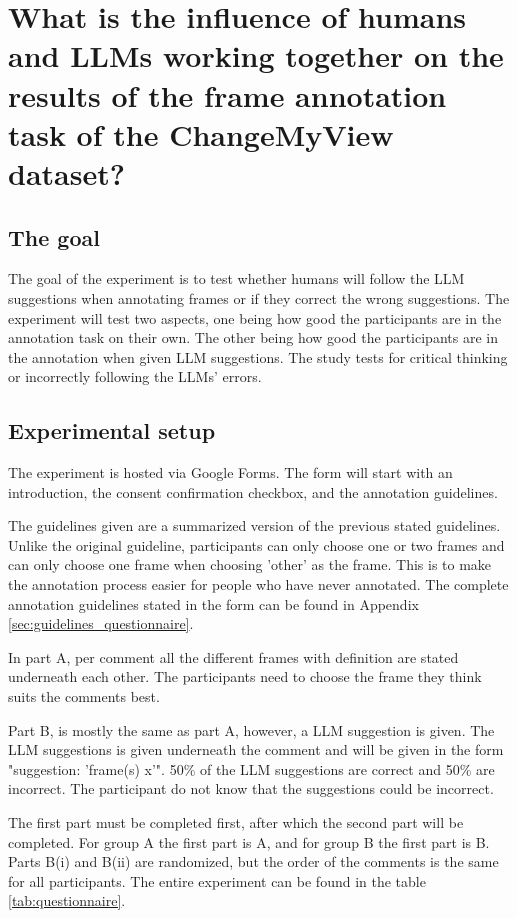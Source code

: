 \documentclass[
10pt, %
a4paper, %
oneside, %
headinclude,footinclude, %
] {book}%
\begin{document}
\section{What is the influence of humans and LLMs working together on the results of the frame annotation task of the ChangeMyView dataset?}

\subsection{The goal}
The goal of the experiment is to test whether humans will follow the LLM suggestions when annotating frames or if they correct the wrong suggestions. The experiment will test two aspects, one being how good the participants are in the annotation task on their own. The other being how good the participants are in the annotation when given LLM suggestions. The study tests for critical thinking or incorrectly following the LLMs' errors. 

\subsection{Experimental setup}
The experiment is hosted via Google Forms. The form will start with an introduction,  the consent confirmation checkbox, and the annotation guidelines. 

The guidelines given are a summarized version of the previous stated guidelines. Unlike the original guideline, participants can only choose one or two frames and can only choose one frame when choosing 'other' as the frame. This is to make the annotation process easier for people who have never annotated. The complete annotation guidelines stated in the form can be found in Appendix \ref{sec:guidelines_questionnaire}.

In part A, per comment all the different frames with definition are stated underneath each other. The participants need to choose the frame they think suits the comments best.

Part B, is mostly the same as part A, however, a LLM suggestion is given. The LLM suggestions is given underneath the comment and will be given in the form "suggestion: 'frame(s) x'". 50\% of the LLM suggestions are correct and 50\% are incorrect. The participant do not know that the suggestions could be incorrect.

The first part must be completed first, after which the second part will be completed. For group A the first part is A, and for group B the first part is B. Parts B(i) and B(ii) are randomized, but the order of the comments is the same for all participants. The entire experiment can be found in the table \ref{tab:questionnaire}.
\end{document}
